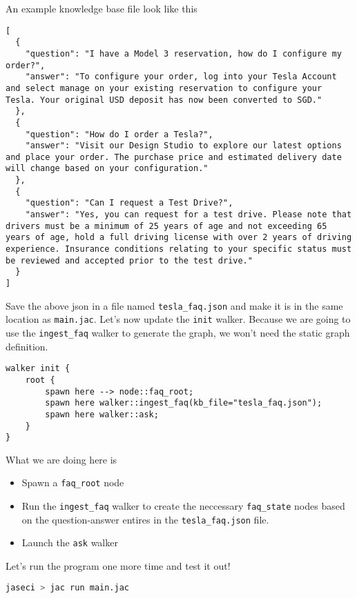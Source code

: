 An example knowledge base file look like this

\begin{lstlisting}
[
  {
    "question": "I have a Model 3 reservation, how do I configure my order?",
    "answer": "To configure your order, log into your Tesla Account and select manage on your existing reservation to configure your Tesla. Your original USD deposit has now been converted to SGD."
  },
  {
    "question": "How do I order a Tesla?",
    "answer": "Visit our Design Studio to explore our latest options and place your order. The purchase price and estimated delivery date will change based on your configuration."
  },
  {
    "question": "Can I request a Test Drive?",
    "answer": "Yes, you can request for a test drive. Please note that drivers must be a minimum of 25 years of age and not exceeding 65 years of age, hold a full driving license with over 2 years of driving experience. Insurance conditions relating to your specific status must be reviewed and accepted prior to the test drive."
  }
]
\end{lstlisting}

Save the above json in a file named \lstinline!tesla_faq.json! and make
it is in the same location as \lstinline!main.jac!. Let's now update the
\lstinline!init! walker. Because we are going to use the
\lstinline!ingest_faq! walker to generate the graph, we won't need the
static graph definition.

\begin{lstlisting}
walker init {
    root {
        spawn here --> node::faq_root;
        spawn here walker::ingest_faq(kb_file="tesla_faq.json");
        spawn here walker::ask;
    }
}
\end{lstlisting}

What we are doing here is

\begin{itemize}
\tightlist
\item
  Spawn a \lstinline!faq_root! node
\item
  Run the \lstinline!ingest_faq! walker to create the neccessary
  \lstinline!faq_state! nodes based on the question-answer entires in
  the \lstinline!tesla_faq.json! file.
\item
  Launch the \lstinline!ask! walker
\end{itemize}

Let's run the program one more time and test it out!

\begin{lstlisting}[language=bash]
jaseci > jac run main.jac
\end{lstlisting}

